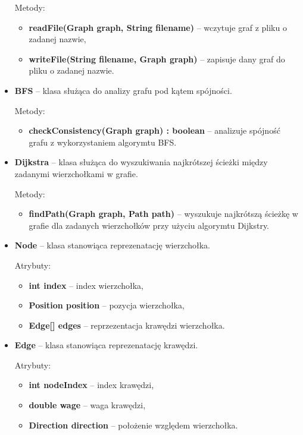 \documentclass{article}
\begin{document}
\begin{itemize}
    Metody:
    \begin{itemize}
        \item \textbf{readFile(Graph graph, String filename)} -- wczytuje graf z pliku o zadanej nazwie,
        \item \textbf{writeFile(String filename, Graph graph)} -- zapisuje dany graf do pliku o zadanej nazwie.
    \end{itemize}
    
    \item \textbf{BFS} -- klasa służąca do analizy grafu pod kątem spójności.
    
    Metody:
    \begin{itemize}
        \item \textbf{checkConsistency(Graph graph) : boolean} -- analizuje spójność grafu z wykorzystaniem algorymtu BFS.
    \end{itemize}
    
    \item \textbf{Dijkstra} -- klasa służąca do wyszukiwania najkrótszej ścieżki między zadanymi wierzchołkami w grafie.
    
    Metody:
    \begin{itemize}
        \item \textbf{findPath(Graph graph, Path path)} -- wyszukuje najkrótszą ścieżkę w grafie dla zadanych wierzchołków przy użyciu algorymtu Dijkstry.
    \end{itemize}
    
    \item \textbf{Node} -- klasa stanowiąca reprezenatację wierzchołka.
    
    Atrybuty:
    \begin{itemize}
        \item \textbf{int index} -- index wierzchołka,
        \item \textbf{Position position} -- pozycja wierzchołka,
        \item \textbf{Edge[] edges} -- reprzezentacja krawędzi wierzchołka.
    \end{itemize}
    
    \item \textbf{Edge} -- klasa stanowiąca reprezenatację krawędzi.
    
    Atrybuty:
    \begin{itemize}
        \item \textbf{int nodeIndex} -- index krawędzi,
        \item \textbf{double wage} -- waga krawędzi,
        \item \textbf{Direction direction} -- położenie względem wierzchołka.
    \end{itemize}
\end{itemize}
\end{document}

